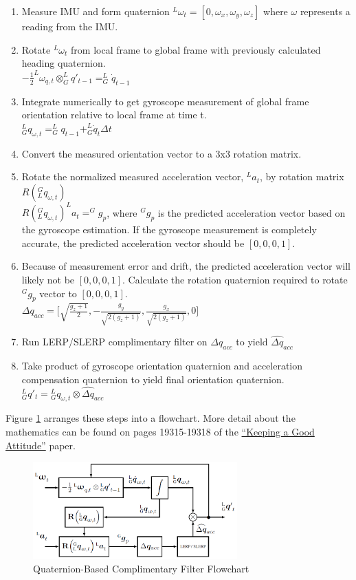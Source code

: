 \documentclass[11pt]{article} %
\begin{document}
\begin{enumerate}
	\item Measure IMU and form quaternion $^L\omega_t = [0, \omega_x, \omega_y, \omega_z]$  where $\omega$ represents a reading from the IMU. 
	\item Rotate $^L\omega_t$ from local frame to global frame with previously calculated heading quaternion. \\$-\frac{1}{2}^L\omega_{q,t} \otimes ^L_Gq'_{t-1} = ^L_G\dot{q}_{t-1}$
	\item Integrate numerically to get gyroscope measurement of global frame orientation relative to local frame at time t.\\ $^L_Gq_{\omega, t} = ^L_Gq_{t-1} + ^L_G\dot{q}_{t}\Delta t$
	\item Convert the measured orientation vector to a 3x3 rotation matrix.
	\item Rotate the normalized measured acceleration vector, $^La_t$, by rotation matrix $R(^G_Lq_{\omega,t})$\\
		   $R(^G_Lq_{\omega,t})^La_t = ^Gg_p$, where $^Gg_p$ is the predicted acceleration vector based on the gyroscope estimation. If the gyroscope measurement is completely accurate, the predicted acceleration vector should be $[0,0,0,1]$. 
	\item Because of measurement error and drift, the predicted acceleration vector will likely not be $[0,0,0,1]$. Calculate the rotation quaternion required to rotate $^Gg_p$ vector to $[0,0,0,1]$. \\
		  $\Delta q_{acc} = \Big[\sqrt{\frac{g_z+1}{2}}, -\frac{g_y}{\sqrt{2(g_z+1)}}, \frac{g_x}{\sqrt{2(g_z+1)}}, 0 \Big]$
	\item Run LERP/SLERP complimentary filter on $\Delta q_{acc}$ to yield $\widehat{\Delta q}_{acc}$
	\item Take product of gyroscope orientation quaternion and acceleration compensation quaternion to yield final orientation quaternion.\\
		  $^L_Gq'_t = {^L_Gq_{\omega, t}} \otimes \widehat{\Delta q}_{acc}$
\end{enumerate}

Figure \ref{fig:quat_flowchart} arranges these steps into a flowchart. More detail about the mathematics can be found on pages 19315-19318 of the \href{http://www.mdpi.com/1424-8220/15/8/19302}{``Keeping a Good Attitude''} paper.

\begin{figure}[H]
\begin{centering}
\includegraphics[width = 0.7\textwidth]{Pictures/quat_flowchart.png}
\caption{Quaternion-Based Complimentary Filter Flowchart}
\label{fig:quat_flowchart}
\end{centering}
\end{figure}
\end{document}
